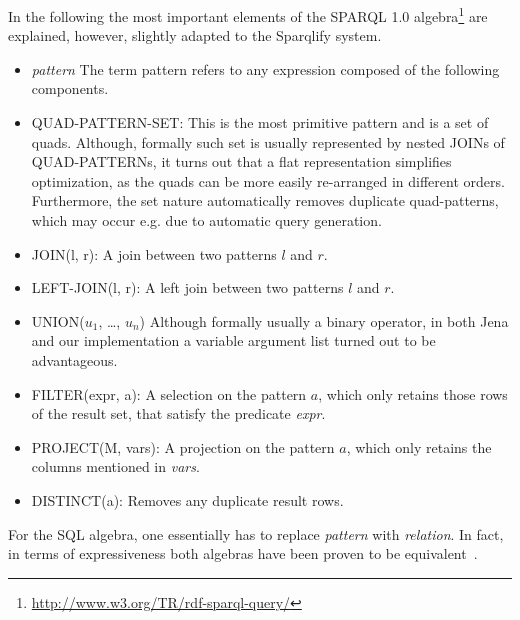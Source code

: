 \documentclass[a4paper,twoside,bibtotoc,abstracton,12pt,BCOR=15mm]{scrreprt}
\newcommand{\todo}[1]{\textbf{ToDo: \textit{#1}}}
\begin{document}
In the following the most important elements of the SPARQL 1.0 algebra\footnote{\url{http://www.w3.org/TR/rdf-sparql-query/}} are explained,
however, slightly adapted to the Sparqlify system.
\begin{itemize}
    \item \emph{pattern} The term pattern refers to any expression composed of the following components.
	\item QUAD-PATTERN-SET: This is the most primitive pattern and is a set of quads.
		Although, formally such set is usually represented by nested JOINs of QUAD-PATTERNs, it turns out that a
		flat representation simplifies optimization, as the quads can be more easily re-arranged in different orders.
		Furthermore, the set nature automatically removes duplicate quad-patterns, which may occur e.g. due to automatic query generation. 
	\item JOIN(l, r): A join between two patterns $l$ and $r$.
	\item LEFT-JOIN(l, r): A left join between two patterns $l$ and $r$.
	\item UNION($u_1$, \ldots, $u_n$) Although formally usually a binary operator, in both Jena and our implementation a variable argument list turned out to be advantageous.
	\item FILTER(expr, a): A selection on the pattern $a$, which only retains those rows of the result set, that satisfy the predicate \emph{expr}.
	\item PROJECT(M, vars): A projection on the pattern $a$, which only retains the columns mentioned in \emph{vars}.
	\item DISTINCT(a): Removes any duplicate result rows.
\end{itemize}
For the SQL algebra, one essentially has to replace \emph{pattern} with \emph{relation}.
In fact, in terms of expressiveness both algebras have been proven to be equivalent~\cite{sparqloverrelational}. 
\end{document}
